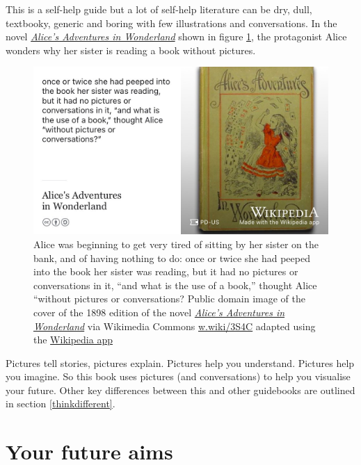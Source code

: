 \documentclass[
]{book}
\begin{document}
This is a self-help guide but a lot of self-help literature can be dry, dull, textbooky, generic and boring with few illustrations and conversations. In the novel \emph{\href{https://en.wikipedia.org/wiki/Alice\%27s_Adventures_in_Wonderland}{Alice's Adventures in Wonderland}} \citep{wonderland} shown in figure \ref{fig:aiw-fig}, the protagonist Alice wonders why her sister is reading a book without pictures.

\begin{figure}
\includegraphics[width=0.99\linewidth]{images/alicequotation} \caption{Alice was beginning to get very tired of sitting by her sister on the bank, and of having nothing to do: once or twice she had peeped into the book her sister was reading, but it had no pictures or conversations in it, ``and what is the use of a book,'' thought Alice ``without pictures or conversations? \citep{wonderland} Public domain image of the cover of the 1898 edition of the novel \emph{\href{https://en.wikipedia.org/wiki/Alice\%27s_Adventures_in_Wonderland}{Alice's Adventures in Wonderland}} via Wikimedia Commons \href{https://w.wiki/3S4C}{w.wiki/3S4C} adapted using the \href{https://apps.apple.com/us/app/wikipedia/id324715238}{Wikipedia app}}\label{fig:aiw-fig}
\end{figure}



Pictures tell stories, pictures explain. Pictures help you understand. Pictures help you imagine. So this book uses pictures (and conversations) to help you visualise your future. Other key differences between this and other guidebooks are outlined in section \ref{thinkdifferent}.

\hypertarget{vaccine}{%
\section{Your future aims}\label{vaccine}}
\end{document}
